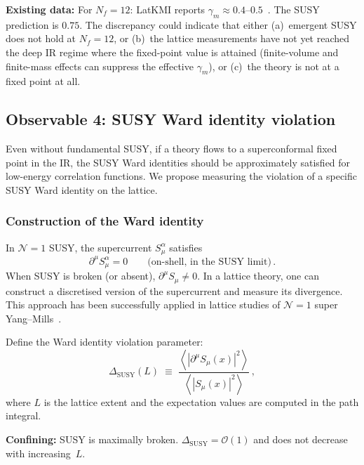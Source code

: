 \documentclass[11pt,a4paper]{article}
\theoremstyle{plain}
\theoremstyle{definition}
\theoremstyle{remark}
\newcommand{\Nf}{N_{\!f}}
\begin{document}
\textbf{Existing data:}  For $\Nf = 12$: LatKMI reports $\gamma_m
\approx 0.4$--$0.5$~\cite{LatKMI2016_Nf12}.  The SUSY prediction is
$0.75$.  The discrepancy could indicate that either (a)~emergent SUSY
does not hold at $\Nf = 12$, or (b)~the lattice measurements have
not yet reached the deep IR regime where the fixed-point value is
attained (finite-volume and finite-mass effects can suppress the
effective $\gamma_m$), or (c)~the theory is not at a fixed point at
all.


\subsection{Observable 4: SUSY Ward identity violation}
\label{ssec:obs4}

Even without fundamental SUSY, if a theory flows to a superconformal
fixed point in the IR, the SUSY Ward identities should be approximately
satisfied for low-energy correlation functions.  We propose measuring
the violation of a specific SUSY Ward identity on the lattice.

\subsubsection{Construction of the Ward identity}

In $\mathcal{N}=1$ SUSY, the supercurrent $S_\mu^\alpha$ satisfies
\begin{equation}\label{eq:WI}
  \partial^\mu S_\mu^\alpha = 0
  \qquad\text{(on-shell, in the SUSY limit)}\,.
\end{equation}
When SUSY is broken (or absent), $\partial^\mu S_\mu \neq 0$.  In a
lattice theory, one can construct a discretised version of the
supercurrent and measure its divergence.  This approach has been
successfully applied in lattice studies of $\mathcal{N}=1$ super
Yang--Mills~\cite{DESY2008,Munster2014}.

Define the Ward identity violation parameter:
\begin{equation}\label{eq:WI-violation}
  \boxed{
    \Delta_{\mathrm{SUSY}}(L) \;\equiv\;
    \frac{
      \left\langle\left|\partial^\mu S_\mu(x)\right|^2\right\rangle
    }{
      \left\langle\left|S_\mu(x)\right|^2\right\rangle
    }\,,
  }
\end{equation}
where $L$ is the lattice extent and the expectation values are computed
in the path integral.

\textbf{Confining:}  SUSY is maximally broken.
$\Delta_{\mathrm{SUSY}} = \mathcal{O}(1)$ and does not decrease with
increasing~$L$.
\end{document}
